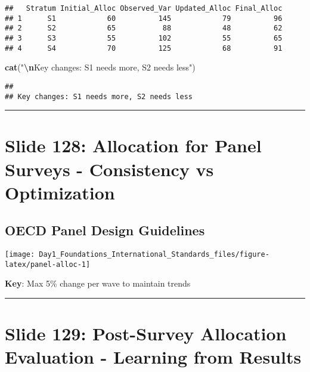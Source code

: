 \documentclass[
]{article}
\newenvironment{Shaded}{\begin{snugshade}}{\end{snugshade}}
\newcommand{\FunctionTok}[1]{\textcolor[rgb]{0.13,0.29,0.53}{\textbf{#1}}}
\newcommand{\NormalTok}[1]{#1}
\newcommand{\SpecialCharTok}[1]{\textcolor[rgb]{0.81,0.36,0.00}{\textbf{#1}}}
\newcommand{\StringTok}[1]{\textcolor[rgb]{0.31,0.60,0.02}{#1}}
\begin{document}
\begin{verbatim}
##   Stratum Initial_Alloc Observed_Var Updated_Alloc Final_Alloc
## 1      S1            60          145            79          96
## 2      S2            65           88            48          62
## 3      S3            55          102            55          65
## 4      S4            70          125            68          91
\end{verbatim}

\begin{Shaded}
\begin{Highlighting}[]
\FunctionTok{cat}\NormalTok{(}\StringTok{"}\SpecialCharTok{\textbackslash{}n}\StringTok{Key changes: S1 needs more, S2 needs less"}\NormalTok{)}
\end{Highlighting}
\end{Shaded}

\begin{verbatim}
## 
## Key changes: S1 needs more, S2 needs less
\end{verbatim}

\begin{center}\rule{0.5\linewidth}{0.5pt}\end{center}

\section{Slide 128: Allocation for Panel Surveys - Consistency vs
Optimization}\label{slide-128-allocation-for-panel-surveys---consistency-vs-optimization}

\subsection{OECD Panel Design
Guidelines}\label{oecd-panel-design-guidelines}

\texttt{[image: Day1\_Foundations\_International\_Standards\_files/figure-latex/panel-alloc-1]}

\textbf{Key}: Max 5\% change per wave to maintain trends

\begin{center}\rule{0.5\linewidth}{0.5pt}\end{center}

\section{Slide 129: Post-Survey Allocation Evaluation - Learning from
Results}\label{slide-129-post-survey-allocation-evaluation---learning-from-results}
\end{document}
